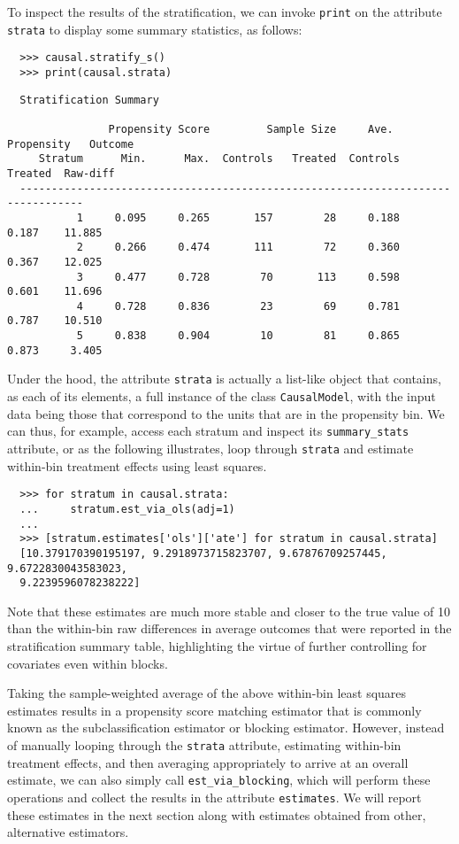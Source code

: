 \documentclass[12pt]{article}
\theoremstyle{definition}
\theoremstyle{definition}
\theoremstyle{definition}
\theoremstyle{remark}
\begin{document}
To inspect the results of the stratification, we can invoke \texttt{print} on the attribute \texttt{strata} to display some summary statistics, as follows:
\begin{verbatim}
  >>> causal.stratify_s()
  >>> print(causal.strata)
\end{verbatim}
\begin{verbatim}
  Stratification Summary
  
                Propensity Score         Sample Size     Ave. Propensity   Outcome
     Stratum      Min.      Max.  Controls   Treated  Controls   Treated  Raw-diff
  --------------------------------------------------------------------------------
           1     0.095     0.265       157        28     0.188     0.187    11.885
           2     0.266     0.474       111        72     0.360     0.367    12.025
           3     0.477     0.728        70       113     0.598     0.601    11.696
           4     0.728     0.836        23        69     0.781     0.787    10.510
           5     0.838     0.904        10        81     0.865     0.873     3.405
\end{verbatim}

Under the hood, the attribute \texttt{strata} is actually a list-like object that contains, as each of its elements, a full instance of the class \texttt{CausalModel}, with the input data being those that correspond to the units that are in the propensity bin. We can thus, for example, access each stratum and inspect its \texttt{summary\_stats} attribute, or as the following illustrates, loop through \texttt{strata} and estimate within-bin treatment effects using least squares.
\begin{verbatim}
  >>> for stratum in causal.strata:
  ...     stratum.est_via_ols(adj=1)
  ... 
  >>> [stratum.estimates['ols']['ate'] for stratum in causal.strata]
  [10.379170390195197, 9.2918973715823707, 9.67876709257445, 9.6722830043583023,
  9.2239596078238222]
\end{verbatim}

Note that these estimates are much more stable and closer to the true value of 10 than the within-bin raw differences in average outcomes that were reported in the stratification summary table, highlighting the virtue of further controlling for covariates even within blocks.

Taking the sample-weighted average of the above within-bin least squares estimates results in a propensity score matching estimator that is commonly known as the subclassification estimator or blocking estimator. However, instead of manually looping through the \texttt{strata} attribute, estimating within-bin treatment effects, and then averaging appropriately to arrive at an overall estimate, we can also simply call \texttt{est\_via\_blocking}, which will perform these operations and collect the results in the attribute \texttt{estimates}. We will report these estimates in the next section along with estimates obtained from other, alternative estimators.
\end{document}
